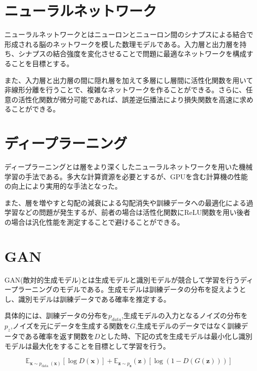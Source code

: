 \section{ニューラルネットワーク}
ニューラルネットワークとはニューロンとニューロン間のシナプスによる結合で形成される脳のネットワークを模した数理モデルである。入力層と出力層を持ち、シナプスの結合強度を変化させることで問題に最適なネットワークを構成することを目標とする。\par
また、入力層と出力層の間に隠れ層を加えて多層にし層間に活性化関数を用いて非線形分離を行うことで、複雑なネットワークを作ることができる。さらに、任意の活性化関数が微分可能であれば、誤差逆伝播法により損失関数を高速に求めることができる。\par


\section{ディープラーニング}

ディープラーニングとは層をより深くしたニューラルネットワークを用いた機械学習の手法である。多大な計算資源を必要とするが、GPUを含む計算機の性能の向上により実用的な手法となった。\par
また、層を増やすと勾配の減衰による勾配消失や訓練データへの最適化による過学習などの問題が発生するが、前者の場合は活性化関数にReLU関数を用い後者の場合は汎化性能を測定することで避けることができる。\par


\section{GAN}

GAN(敵対的生成モデル)とは生成モデルと識別モデルが競合して学習を行うディープラーニングのモデルである。生成モデルは訓練データの分布を捉えようとし、識別モデルは訓練データである確率を推定する。\par
具体的には、訓練データの分布を$p_{data}$,生成モデルの入力となるノイズの分布を$p_z$,ノイズを元にデータを生成する関数を$G$,生成モデルのデータではなく訓練データである確率を返す関数を$D$とした時、下記の式を生成モデルは最小化し識別モデルは最大化をすることを目標として学習を行う\cite{GAN}。

$$\mathbb{E}_{\boldsymbol{x} \sim p_{\text {data }}(\boldsymbol{x})}[\log D(\boldsymbol{x})]+\mathbb{E}_{\boldsymbol{z} \sim p_{\boldsymbol{z}}}(\boldsymbol{z})[\log (1-D(G(\boldsymbol{z})))]$$

